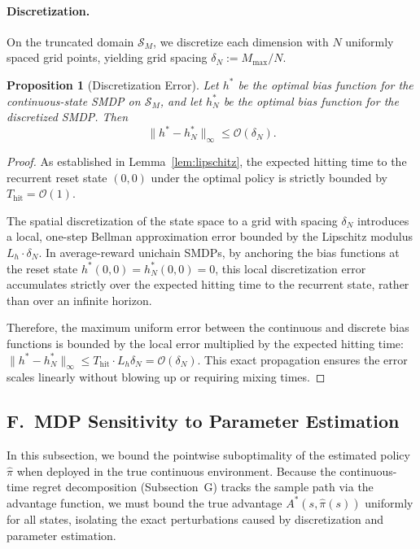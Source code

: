 \documentclass[letterpaper, 10 pt, conference]{IEEEconf}
\newtheorem{proposition}{Proposition}
\newcommand{\what}[1]{\widehat{#1}}
\begin{document}
\paragraph{Discretization.}
On the truncated domain $\mathcal{S}_M$, we discretize each dimension with $N$ uniformly spaced grid points, yielding grid spacing $\delta_N := M_{\max} / N$.

\begin{proposition}[Discretization Error]
    \label{prop:discretization}
    Let $h^*$ be the optimal bias function for the continuous-state SMDP on $\mathcal{S}_M$, and let $h^*_N$ be the optimal bias function for the discretized SMDP. Then
    \begin{equation}
        \|h^* - h^*_N\|_\infty \leq \mathcal{O}(\delta_N).
    \end{equation}
\end{proposition}
\begin{proof}
    As established in Lemma~\ref{lem:lipschitz}, the expected hitting time to the recurrent reset state $(0,0)$ under the optimal policy is strictly bounded by $T_{\mathrm{hit}} = \mathcal{O}(1)$.

    The spatial discretization of the state space to a grid with spacing $\delta_N$ introduces a local, one-step Bellman approximation error bounded by the Lipschitz modulus $L_h \cdot \delta_N$. In average-reward unichain SMDPs, by anchoring the bias functions at the reset state $h^*(0,0) = h^*_N(0,0) = 0$, this local discretization error accumulates strictly over the expected hitting time to the recurrent state, rather than over an infinite horizon.

    Therefore, the maximum uniform error between the continuous and discrete bias functions is bounded by the local error multiplied by the expected hitting time: $\|h^* - h^*_N\|_\infty \le T_{\mathrm{hit}} \cdot L_h \delta_N = \mathcal{O}(\delta_N)$. This exact propagation ensures the error scales linearly without blowing up or requiring mixing times.
\end{proof}


\subsection*{F.~MDP Sensitivity to Parameter Estimation}
\label{sec:app_sensitivity}

In this subsection, we bound the pointwise suboptimality of the estimated policy $\what{\pi}$ when deployed in the true continuous environment. Because the continuous-time regret decomposition (Subsection~G) tracks the sample path via the advantage function, we must bound the true advantage $A^*(s, \what{\pi}(s))$ uniformly for all states, isolating the exact perturbations caused by discretization and parameter estimation.
\end{document}
